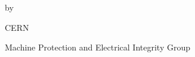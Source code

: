 \begin{titlepage}
    \hypertarget{titlepage}{} %
    \centering
    \vspace*{1cm}

    \LARGE
    \thetitle

    \Large
    \vspace{0.5cm}

    by

    \vspace{0.5cm}
    \theauthor

    \vfill

    \vspace{0.8cm}
    

    \Large
    CERN

    Machine Protection and Electrical Integrity Group

    \thedate
    \vspace*{1cm}
\end{titlepage}